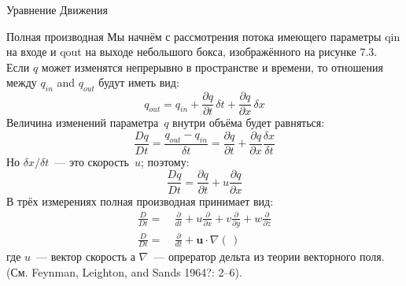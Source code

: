 \begin{chapter}{Уравнение Движения}
\begin{section}{Полная производная}
Мы начнём с рассмотрения потока имеющего параметры qin на входе и qout
на выходе небольшого бокса, изображённого на рисунке 7.3.
Если $q$ может изменятся непрерывно в пространстве и времени, то
отношения между $q_{in}$ and $q_{out}$ будут иметь вид:
\begin{equation}
q_{out} = q_{in} + \frac{\partial{q}}{\partial{t}}\,\delta{t} + \frac{\partial{q}}{\partial{x}}\,\delta{x}
\end{equation}
Величина изменений параметра~$q$ внутри объёма будет равняться:
\begin{equation}
\frac{Dq}{Dt} = \frac{q_{out} - q_{in}}{\delta{t}}=
\frac{\partial{q}}{\partial{t}} +
\frac{\partial{q}}{\partial{x}}\frac{\delta{x}}{\delta{t}}
\end{equation}
Но $\delta x /\delta t$~--- это скорость~$u$; поэтому:
\begin{displaymath}
\frac{Dq}{Dt} = \frac{\partial{q}}{\partial{t}} +
u\frac{\partial{q}}{\partial{x}}
\end{displaymath}
В трёх измерениях полная производная принимает вид:
\begin{subequations}
\begin{align}
\frac{D}{Dt} = & \:\frac{\partial}{dt} + u\frac{\partial}{\partial{x}} + v\frac{\partial}{\partial y} + w\frac{\partial
}{\partial z}
\\
\frac{D}{Dt} = & \:\frac{\partial}{dt} +
\mathbf{u}\cdot \nabla(\,)
\end{align}
\end{subequations}
где $u$~--- вектор скорость а $\nabla$~--- опрератор дельта из теории
векторного поля. (См. Feynman, Leighton, and Sands 1964?: 2--6).
%

\end{section}
\end{chapter}
